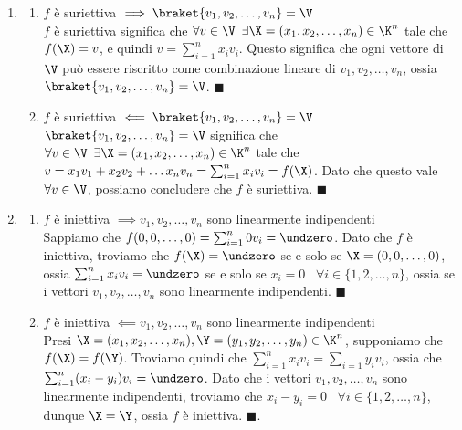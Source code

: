 \documentclass[11pt, a4paper, titlepage, oneside]{scrbook}
\begin{document}
\begin{enumerate}[label=\alph*)]
    \item \begin{enumerate}[label=\arabic*°]
        \item $f$ è suriettiva $\implies \braket{v_1, v_2, \ldots, v_n} = \V$ \\
        $f$ è suriettiva significa che $\forall v \in \V \enspace \exists \X = (x_1, x_2, \ldots, x_n) \in \K^n$ tale che $f(\X) = v$, e quindi $v = \sum_{i = 1}^n x_i v_i$. Questo significa che ogni vettore di $\V$ può essere riscritto come combinazione lineare di $v_1, v_2, \ldots, v_n$, ossia $\braket{v_1, v_2, \ldots, v_n} = \V$. $\blacksquare$
        \item $f$ è suriettiva $\impliedby \braket{v_1, v_2, \ldots, v_n} = \V$ \\
        $\braket{v_1, v_2, \ldots, v_n} = \V$ significa che $\forall v \in \V \enspace \exists \X = (x_1, x_2, \ldots, x_n) \in \K^n$ tale che \mbox{$v = x_1 v_1 + x_2 v_2 + \ldots x_n v_n = \sum_{i = 1}^n x_i v_i = f(\X)$}. Dato che questo vale $\forall v \in \V$, possiamo concludere che $f$ è suriettiva. $\blacksquare$ 
    \end{enumerate}
    \item \begin{enumerate}[label=\arabic*°]
        \item $f$ è iniettiva $\implies v_1, v_2, \ldots, v_n$ sono linearmente indipendenti \\
        Sappiamo che $f(0,0,\ldots,0) = \sum_{i = 1}^n 0 v_i = \undzero$. Dato che $f$ è iniettiva, troviamo che $f(\X) = \undzero$ se e solo se $\X = (0,0,\ldots,0)$, ossia $\sum_{i = 1}^n x_i v_i = \undzero$ se e solo se $x_i = 0 \enspace$ \mbox{$\forall i \in \{1,2, \ldots, n\}$}, ossia se i vettori $v_1, v_2, \ldots, v_n$ sono linearmente indipendenti. $\blacksquare$
        \item $f$ è iniettiva $\impliedby v_1, v_2, \ldots, v_n$ sono linearmente indipendenti \\
        Presi $\X = (x_1, x_2, \ldots, x_n), \Y = (y_1, y_2, \ldots, y_n) \in \K^n$, supponiamo che $f(\X) = f(\Y)$. Troviamo quindi che $\sum_{i = 1}^n x_i v_i = \sum_{i = 1} y_i v_i$, ossia che $\sum_{i = 1}^n (x_i - y_i) v_i = \undzero$. Dato che i vettori $v_1, v_2, \ldots, v_n$ sono linearmente indipendenti, troviamo che $x_i - y_i = 0 \enspace$ \mbox{$\forall i \in \{1, 2, \ldots, n\}$}, dunque $\X = \Y$, ossia $f$ è iniettiva. $\blacksquare$. 
    \end{enumerate}
\end{enumerate}
\end{document}
